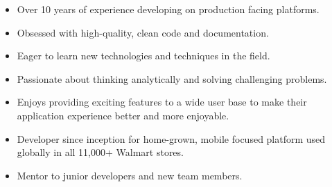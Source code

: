 \documentclass[10pt,a4paper]{resume}
\begin{document}





\begin{fullwidth}
\makecvheader
\end{fullwidth}





\begin{itemize}
\item Over 10 years of experience developing on production facing platforms.
\item Obsessed with high-quality, clean code and documentation.
\item Eager to learn new technologies and techniques in the field.
\item Passionate about thinking analytically and solving challenging problems.
\item Enjoys providing exciting features to a wide user base to make their application experience better and more enjoyable.
\end{itemize}


\begin{itemize}
\item Developer since inception for home-grown, mobile focused platform used globally in all 11,000+ Walmart stores.
\item Mentor to junior developers and new team members.
\end{itemize}
\end{document}
